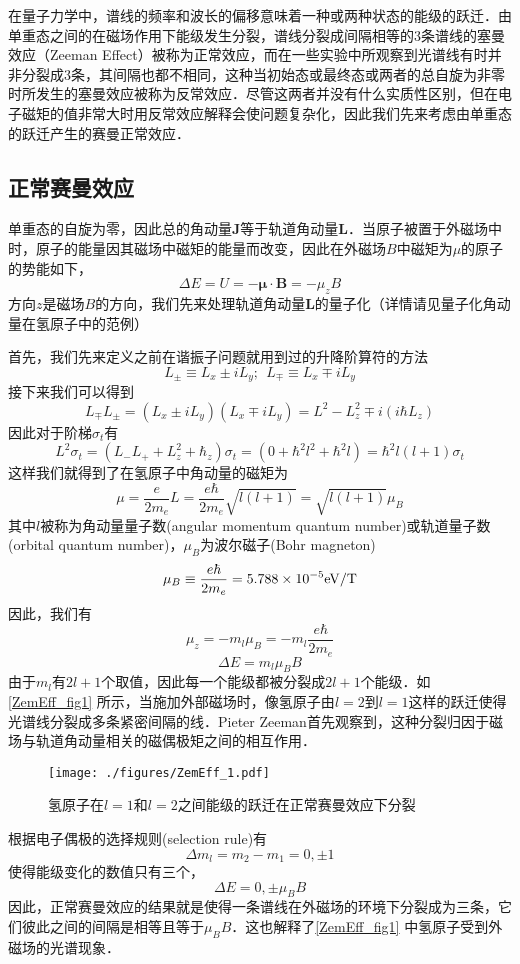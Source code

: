

在量子力学中，谱线的频率和波长的偏移意味着一种或两种状态的能级的跃迁．由单重态之间的在磁场作用下能级发生分裂，谱线分裂成间隔相等的3条谱线的塞曼效应（Zeeman Effect）被称为正常效应，而在一些实验中所观察到光谱线有时并非分裂成3条，其间隔也都不相同，这种当初始态或最终态或两者的总自旋为非零时所发生的塞曼效应被称为反常效应．尽管这两者并没有什么实质性区别，但在电子磁矩的值非常大时用反常效应解释会使问题复杂化，因此我们先来考虑由单重态的跃迁产生的赛曼正常效应．

\subsection{正常赛曼效应}
单重态的自旋为零，因此总的角动量$\mathbf{J}$等于轨道角动量$\mathbf{L}$．当原子被置于外磁场中时，原子的能量因其磁场中磁矩的能量而改变，因此在外磁场$B$中磁矩为$\mu$的原子的势能如下，
$$\Delta E=U = -\boldsymbol\mu\cdot \mathbf{B}=-\mu_z B$$方向$z$是磁场$B$的方向，我们先来处理轨道角动量$\mathbf{L}$的量子化（详情请见量子化角动量在氢原子中的范例）

首先，我们先来定义之前在谐振子问题就用到过的升降阶算符的方法
\begin{equation}
L_{\pm}\equiv L_x \pm iL_y;\ \ L_{\mp}\equiv L_x \mp iL_y
\end{equation}
接下来我们可以得到
\begin{equation}
L_{\mp}L_{\pm}=(L_x \pm i L_y)(L_x \mp i L_y)=L^2-L_z^2\mp i(i\hbar L_z)
\end{equation}
因此对于阶梯$\sigma_t$有
\begin{equation}
L^2\sigma_t=(L_{-}L_{+}+L^2_z+\hbar_z)\sigma_t=(0+\hbar^2l^2+\hbar^2l)=\hbar^2l(l+1)\sigma_t
\end{equation}
这样我们就得到了在氢原子中角动量的磁矩为
$$\mu=\frac{e}{2m_e}L=\frac{e\hbar}{2m_e}\sqrt{l(l+1)}=\sqrt{l(l+1)}\mu_B$$
其中$l$被称为角动量量子数(angular momentum quantum number)或轨道量子数(orbital quantum number)，$\mu_B$为波尔磁子(Bohr magneton)
$$\mu_B\equiv\frac{e\hbar}{2m_e}=5.788\times 10^{-5}\rm{eV/T}$$
因此，我们有$$\mu_z=-m_l\mu_B=-m_l\frac{e\hbar}{2m_e}$$
\begin{equation}
\boxed{\Delta E = m_l\mu_B B}
\end{equation}
由于$m_l$有$2l+1$个取值，因此每一个能级都被分裂成$2l+1$个能级．如\autoref{ZemEff_fig1} 所示，当施加外部磁场时，像氢原子由$l=2$到$l=1$这样的跃迁使得光谱线分裂成多条紧密间隔的线．Pieter Zeeman首先观察到，这种分裂归因于磁场与轨道角动量相关的磁偶极矩之间的相互作用．
\begin{figure}[ht]
\centering
\texttt{[image: ./figures/ZemEff\_1.pdf]}
\caption{氢原子在$l=1$和$l=2$之间能级的跃迁在正常赛曼效应下分裂} \label{ZemEff_fig1}
\end{figure}
根据电子偶极的选择规则(selection rule)有
$$
\Delta m_l = m_2-m_1=0,\pm 1
$$
使得能级变化的数值只有三个，
$$
\Delta E = 0,\pm \mu_B B
$$
因此，正常赛曼效应的结果就是使得一条谱线在外磁场的环境下分裂成为三条，它们彼此之间的间隔是相等且等于$\mu_B B$．这也解释了\autoref{ZemEff_fig1} 中氢原子受到外磁场的光谱现象．
